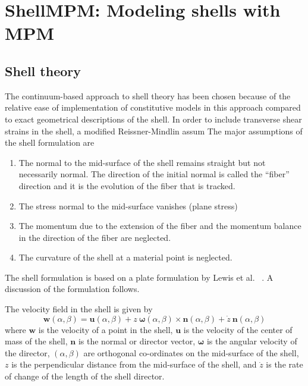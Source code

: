 \chapter{ShellMPM: Modeling shells with MPM}
  \section{Shell theory}
  The continuum-based approach to shell theory has been chosen because
  of the relative ease of implementation of constitutive models in this
  approach compared to exact geometrical descriptions of the shell.  In 
  order to include transverse shear strains in the shell, a modified
  Reissner-Mindlin assum  The major assumptions of the
  shell formulation are~\cite{Belyt2000,Lewis1998}
  \begin{enumerate}
    \item The normal to the mid-surface of the shell remains straight
          but not necessarily normal.  The direction of the initial
          normal is called the ``fiber'' direction and it is the evolution
          of the fiber that is tracked.
    \item The stress normal to the mid-surface vanishes (plane stress)
    \item The momentum due to the extension of the fiber and the momentum
          balance in the direction of the fiber are neglected.
    \item The curvature of the shell at a material point is neglected.
  \end{enumerate}
  The shell formulation is based on a plate formulation by Lewis et al.
  ~\cite{Lewis1998}.  A discussion of the formulation follows.  

  The velocity field in the shell is given by
  \begin{equation}
    \mathbf{w}(\alpha,\beta) = \mathbf{u}(\alpha,\beta) 
        +z~\boldsymbol{\omega}(\alpha,\beta)\times \mathbf{n}(\alpha,\beta)
        +\dot{z}~\mathbf{n}(\alpha,\beta) \label{eq:velField}
  \end{equation}
  where $\mathbf{w}$ is the velocity of a point in the shell,
        $\mathbf{u}$ is the velocity of the center of mass of the shell,
        $\mathbf{n}$ is the normal or director vector,
        $\boldsymbol{\omega}$ is the angular velocity of the director,
        $(\alpha,\beta)$ are orthogonal co-ordinates on the mid-surface of
        the shell, $z$ is the perpendicular distance from the mid-surface
        of the shell, and $\dot{z}$ is the rate of change of the length 
        of the shell director.

